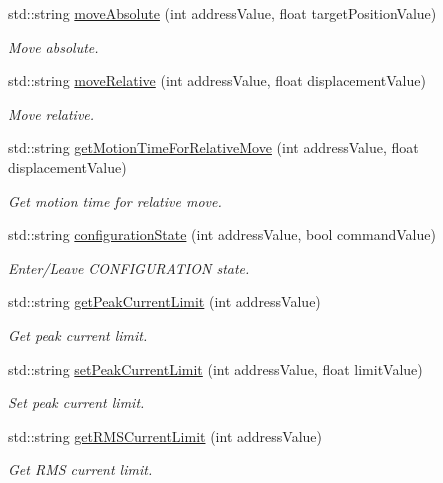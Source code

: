 \begin{DoxyCompactItemize}
std\+::string \hyperlink{namespaceconex_ae52a8731032ef6b65b942aa0573d81cc}{move\+Absolute} (int address\+Value, float target\+Position\+Value)
\begin{DoxyCompactList}\small\item\em Move absolute. \end{DoxyCompactList}\item 
std\+::string \hyperlink{namespaceconex_a6728914e77941e2fb4483b6721785ffb}{move\+Relative} (int address\+Value, float displacement\+Value)
\begin{DoxyCompactList}\small\item\em Move relative. \end{DoxyCompactList}\item 
std\+::string \hyperlink{namespaceconex_aab2d3f712ba59df6e3001ea727d3c514}{get\+Motion\+Time\+For\+Relative\+Move} (int address\+Value, float displacement\+Value)
\begin{DoxyCompactList}\small\item\em Get motion time for relative move. \end{DoxyCompactList}\item 
std\+::string \hyperlink{namespaceconex_aa9f0011a56576d7e9382d9d7d211e946}{configuration\+State} (int address\+Value, bool command\+Value)
\begin{DoxyCompactList}\small\item\em Enter/\+Leave C\+O\+N\+F\+I\+G\+U\+R\+A\+T\+I\+ON state. \end{DoxyCompactList}\item 
std\+::string \hyperlink{namespaceconex_a4d69b5890ba99a072d3a3ef67f26047a}{get\+Peak\+Current\+Limit} (int address\+Value)
\begin{DoxyCompactList}\small\item\em Get peak current limit. \end{DoxyCompactList}\item 
std\+::string \hyperlink{namespaceconex_ad4e9c3f1429c4d356c4814c816b1ce42}{set\+Peak\+Current\+Limit} (int address\+Value, float limit\+Value)
\begin{DoxyCompactList}\small\item\em Set peak current limit. \end{DoxyCompactList}\item 
std\+::string \hyperlink{namespaceconex_a7f0202ac44e29e633656eac06ca43cd0}{get\+R\+M\+S\+Current\+Limit} (int address\+Value)
\begin{DoxyCompactList}\small\item\em Get R\+MS current limit. \end{DoxyCompactList}\item 

\end{DoxyCompactItemize}
